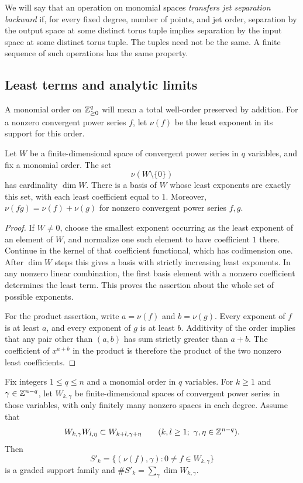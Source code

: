 We will say that an operation on monomial spaces \emph{transfers jet
separation backward} if, for every fixed degree, number of points, and jet
order, separation by the output space at some distinct torus tuple implies
separation by the input space at some distinct torus tuple. The tuples need
not be the same. A finite sequence of such operations has the same property.

\subsection{Least terms and analytic limits}

A monomial order on $\mathbb Z_{\geq0}^q$ will mean a total well-order preserved by
addition. For a nonzero convergent power series $f$, let $\nu(f)$ be the
least exponent in its support for this order.

\begin{lemma}\label{lem:least-terms}
Let $W$ be a finite-dimensional space of convergent power series in $q$
variables, and fix a monomial order. The set
\[
 \nu(W\setminus\{0\})
\]
has cardinality $\dim W$. There is a basis of $W$ whose least exponents are
exactly this set, with each least coefficient equal to $1$. Moreover,
$\nu(fg)=\nu(f)+\nu(g)$ for nonzero convergent power series $f,g$.
\end{lemma}

\begin{proof}
If $W\ne0$, choose the smallest exponent occurring as the least exponent of
an element of $W$, and normalize one such element to have coefficient $1$
there. Continue in the kernel of that coefficient functional, which has
codimension one. After $\dim W$ steps this gives a basis with strictly
increasing least exponents. In any nonzero linear combination, the first
basis element with a nonzero coefficient determines the least term. This
proves the assertion about the whole set of possible exponents.

For the product assertion, write $a=\nu(f)$ and $b=\nu(g)$. Every exponent
of $f$ is at least $a$, and every exponent of $g$ is at least $b$. Additivity
of the order implies that any pair other than $(a,b)$ has sum strictly
greater than $a+b$. The coefficient of $x^{a+b}$ in the product is therefore
the product of the two nonzero least coefficients.
\end{proof}

\begin{lemma}\label{lem:row-valuation}
Fix integers $1\leq q\leq n$ and a monomial order in $q$ variables. For
$k\geq1$ and $\gamma\in\mathbb Z^{n-q}$, let $W_{k,\gamma}$ be
finite-dimensional spaces of convergent power series in those variables,
with only finitely many nonzero spaces in each degree. Assume that
\[
 W_{k,\gamma}W_{l,\eta}\subset W_{k+l,\gamma+\eta}
 \qquad(k,l\geq1;\ \gamma,\eta\in\mathbb Z^{n-q}).
\]
Then
\[
 S'_k=\{(\nu(f),\gamma):0\ne f\in W_{k,\gamma}\}
\]
is a graded support family and
$\#S'_k=\sum_\gamma\dim W_{k,\gamma}$.
\end{lemma}

